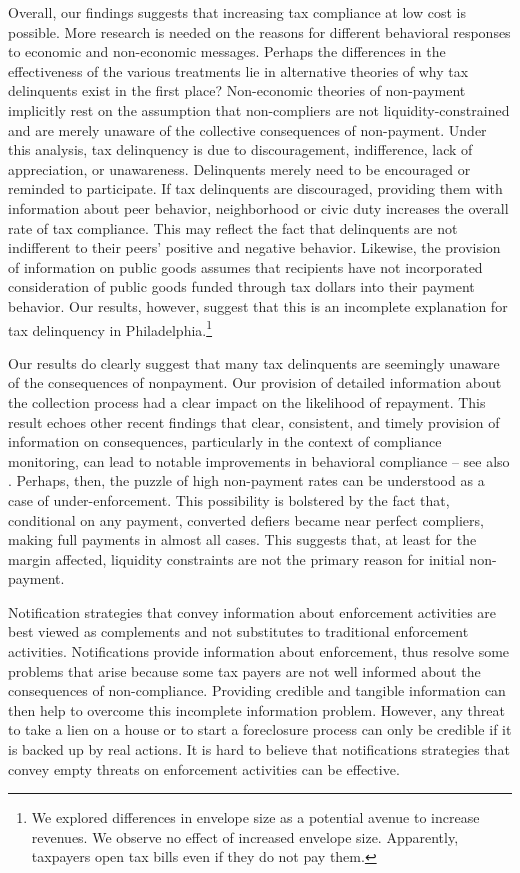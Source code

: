 \documentclass[12pt]{article}
\begin{document}
Overall, our findings suggests that increasing tax compliance at low
cost is possible. More research is needed on the reasons for different
behavioral responses to economic and non-economic messages. 
Perhaps the differences in the effectiveness of the various
treatments lie in alternative theories of why tax delinquents exist in
the first place? Non-economic theories of non-payment
implicitly rest on the assumption that non-compliers are not
liquidity-constrained and are merely unaware of the collective
consequences of non-payment. Under this analysis, tax delinquency is
due to discouragement, indifference, lack of appreciation, or
unawareness. Delinquents merely need to be encouraged or reminded to
participate. If tax delinquents are discouraged, providing them with
information about peer behavior, neighborhood or civic duty increases
the overall rate of tax compliance. This may reflect the fact that
delinquents are not indifferent to their peers' positive and negative
behavior. Likewise, the provision of information on public goods
assumes that recipients have not incorporated consideration of public
goods funded through tax dollars into their payment behavior.  Our
results, however, suggest that this is an incomplete explanation for
tax delinquency in Philadelphia.\footnote{We explored differences in
envelope size as a potential avenue to increase revenues. We observe
no effect of increased envelope size.  Apparently, taxpayers open
tax bills even if they do not pay them.}

Our results do clearly suggest that many tax delinquents are seemingly
unaware of the consequences of nonpayment. Our provision of detailed
information about the collection process had a clear impact on the
likelihood of repayment. This result echoes other recent findings that
clear, consistent, and timely provision of information on
consequences, particularly in the context of compliance monitoring,
can lead to notable improvements in behavioral compliance -- see also
. Perhaps, then, the puzzle of high non-payment rates
can be understood as a case of under-enforcement. This possibility is
bolstered by the fact that, conditional on any payment, converted
defiers became near perfect compliers, making full payments in almost
all cases. This suggests that, at least for the margin affected,
liquidity constraints are not the primary reason for initial
non-payment.

Notification strategies that convey information about enforcement
activities are best viewed as complements and not substitutes to
traditional enforcement activities.  Notifications provide information
about enforcement, thus resolve some problems that arise because some
tax payers are not well informed about the consequences of
non-compliance.  Providing credible and tangible information can then
help to overcome this incomplete information problem.  However, any
threat to take a lien on a house or to start a foreclosure process can
only be credible if it is backed up by real actions. It is hard to
believe that notifications strategies that convey empty threats on
enforcement activities can be effective.
\end{document}
